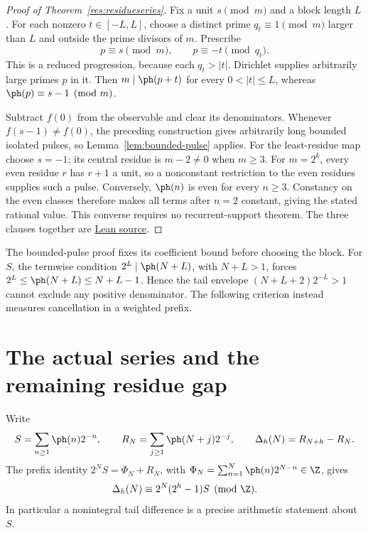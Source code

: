 \documentclass[11pt]{article}
\begin{document}
\begin{proof}[Proof of Theorem~\ref{res:residueseries}]
Fix a unit $s\pmod m$ and a block length $L$. For each nonzero
$t\in[-L,L]$, choose a distinct prime $q_t\equiv1\pmod m$ larger than $L$
and outside the prime divisors of $m$. Prescribe
\[
 p\equiv s\pmod m,\qquad p\equiv-t\pmod{q_t}.
\]
This is a reduced progression, because each $q_t>|t|$. Dirichlet supplies
arbitrarily large primes $p$ in it. Then $m\mid\ph(p+t)$ for every
$0<|t|\le L$, whereas $\ph(p)\equiv s-1\pmod m$.

Subtract $f(0)$ from the observable and clear its denominators. Whenever
$f(s-1)\ne f(0)$, the preceding construction gives arbitrarily long bounded
isolated pulses, so Lemma~\ref{lem:bounded-pulse} applies. For the
least-residue map choose $s=-1$: its central residue is $m-2\ne0$ when
$m\ge3$. For $m=2^k$, every even residue $r$ has $r+1$ a unit, so a
nonconstant restriction to the even residues supplies such a pulse.
Conversely, $\ph(n)$ is even for every $n\ge3$. Constancy on the even
classes therefore makes all terms after $n=2$ constant, giving the stated
rational value. This converse requires no recurrent-support theorem.
The three clauses together are
\href{https://github.com/wcook04/plectis-erdos/blob/f36a98bf3d3e6f65f1074e3b800e3293d5b8a51a/ErdosProblems/Erdos249/PaperCompleteR7/RationalObservableClassification.lean#L277}{Lean source}.
\end{proof}
The bounded-pulse proof fixes its coefficient bound before choosing the block.
For $S$, the termwise condition $2^L\mid\ph(N+L)$, with $N+L>1$, forces
$2^L\le\ph(N+L)\le N+L-1$. Hence the tail envelope
$(N+L+2)2^{-L}>1$ cannot exclude any positive denominator.
The following criterion instead measures cancellation in a weighted prefix.

\section{The actual series and the remaining residue gap}\label{sec:carry-rank}
Write
\[
 S=\sum_{n\ge1}\ph(n)2^{-n},\qquad
 R_N=\sum_{j\ge1}\ph(N+j)2^{-j},\qquad
 \Delta_h(N)=R_{N+h}-R_N.
\]
The prefix identity $2^NS=\Phi_N+R_N$, with
$\Phi_N=\sum_{n=1}^N\ph(n)2^{N-n}\in\Z$, gives
\begin{equation}\label{eq:tail-phase}
 \Delta_h(N)\equiv2^N(2^h-1)S\pmod\Z.
\end{equation}
In particular a nonintegral tail difference is a precise arithmetic
statement about $S$.
\end{document}
